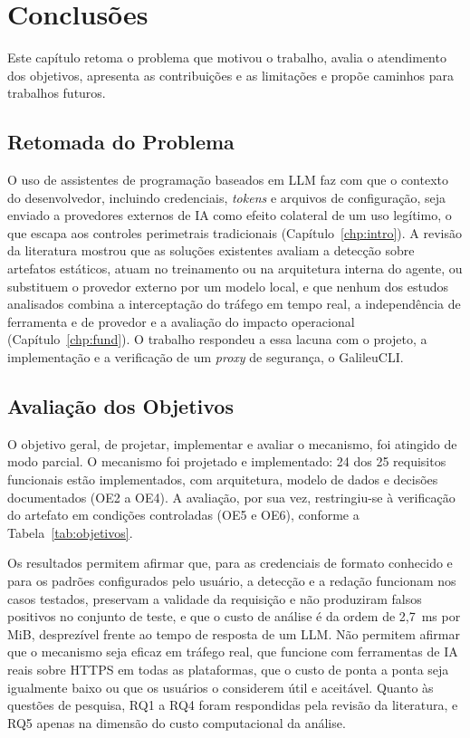 \chapter{Conclusões}\label{chp:conc}

Este capítulo retoma o problema que motivou o trabalho, avalia o atendimento dos objetivos, apresenta as contribuições e as limitações e propõe caminhos para trabalhos futuros.

\section{Retomada do Problema}

O uso de assistentes de programação baseados em LLM faz com que o contexto do desenvolvedor, incluindo credenciais, \textit{tokens} e arquivos de configuração, seja enviado a provedores externos de IA como efeito colateral de um uso legítimo, o que escapa aos controles perimetrais tradicionais (Capítulo~\ref{chp:intro}). A revisão da literatura mostrou que as soluções existentes avaliam a detecção sobre artefatos estáticos, atuam no treinamento ou na arquitetura interna do agente, ou substituem o provedor externo por um modelo local, e que nenhum dos estudos analisados combina a interceptação do tráfego em tempo real, a independência de ferramenta e de provedor e a avaliação do impacto operacional (Capítulo~\ref{chp:fund}). O trabalho respondeu a essa lacuna com o projeto, a implementação e a verificação de um \textit{proxy} de segurança, o GalileuCLI.

\section{Avaliação dos Objetivos}

O objetivo geral, de projetar, implementar e avaliar o mecanismo, foi atingido de modo parcial. O mecanismo foi projetado e implementado: 24 dos 25 requisitos funcionais estão implementados, com arquitetura, modelo de dados e decisões documentados (OE2 a OE4). A avaliação, por sua vez, restringiu-se à verificação do artefato em condições controladas (OE5 e OE6), conforme a Tabela~\ref{tab:objetivos}.

Os resultados permitem afirmar que, para as credenciais de formato conhecido e para os padrões configurados pelo usuário, a detecção e a redação funcionam nos casos testados, preservam a validade da requisição e não produziram falsos positivos no conjunto de teste, e que o custo de análise é da ordem de 2,7~ms por MiB, desprezível frente ao tempo de resposta de um LLM. Não permitem afirmar que o mecanismo seja eficaz em tráfego real, que funcione com ferramentas de IA reais sobre HTTPS em todas as plataformas, que o custo de ponta a ponta seja igualmente baixo ou que os usuários o considerem útil e aceitável. Quanto às questões de pesquisa, RQ1 a RQ4 foram respondidas pela revisão da literatura, e RQ5 apenas na dimensão do custo computacional da análise.

